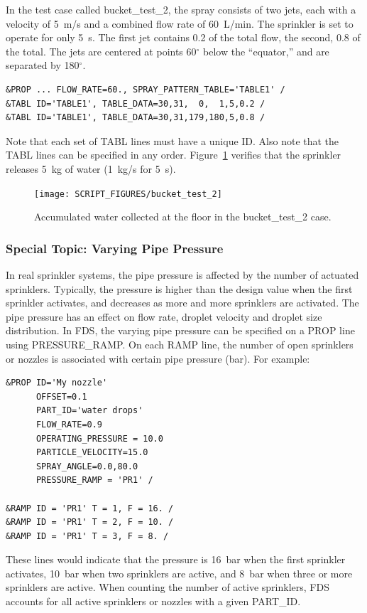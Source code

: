 \documentclass[11pt]{book}
\begin{document}
In the test case called {\ct bucket\_test\_2}, the spray consists of two jets, each with a velocity of 5~m/s and a combined flow rate of 60~L/min. The sprinkler is set to operate for only 5~s. The first jet contains 0.2 of the total flow, the second, 0.8 of the total. The jets are centered at points 60$^\circ$ below the ``equator,'' and are separated by 180$^\circ$.
\begin{lstlisting}
&PROP ... FLOW_RATE=60., SPRAY_PATTERN_TABLE='TABLE1' /
&TABL ID='TABLE1', TABLE_DATA=30,31,  0,  1,5,0.2 /
&TABL ID='TABLE1', TABLE_DATA=30,31,179,180,5,0.8 /
\end{lstlisting}
Note that each set of {\ct TABL} lines must have a unique {\ct ID}.  Also note that the {\ct TABL} lines can be specified in any order. Figure~\ref{bucket_test_2_fig} verifies that the sprinkler releases 5~kg of water (1~kg/s for 5~s).

\begin{figure}[ht]
\centering
\texttt{[image: SCRIPT\_FIGURES/bucket\_test\_2]}
\caption[Results of the {\ct bucket\_test\_2} case]{Accumulated water collected at the floor in the {\ct bucket\_test\_2} case.}
\label{bucket_test_2_fig}
\end{figure}




\subsubsection{Special Topic: Varying Pipe Pressure}
\label{info:pressureramp}

In real sprinkler systems, the pipe pressure is affected by the number of actuated sprinklers. Typically, the pressure is higher than the design value when the first sprinkler activates, and decreases as more and more sprinklers are activated. The pipe pressure has an effect on flow rate, droplet velocity and droplet size distribution. In FDS, the varying pipe pressure can be specified on a {\ct PROP} line using {\ct PRESSURE\_RAMP}. On each {\ct RAMP} line, the number of open sprinklers or nozzles is associated with certain pipe pressure (bar). For example:
\begin{lstlisting}
&PROP ID='My nozzle'
      OFFSET=0.1
      PART_ID='water drops'
      FLOW_RATE=0.9
      OPERATING_PRESSURE = 10.0
      PARTICLE_VELOCITY=15.0
      SPRAY_ANGLE=0.0,80.0
      PRESSURE_RAMP = 'PR1' /

&RAMP ID = 'PR1' T = 1, F = 16. /
&RAMP ID = 'PR1' T = 2, F = 10. /
&RAMP ID = 'PR1' T = 3, F = 8. /
\end{lstlisting}
These lines would indicate that the pressure is 16~bar when the first sprinkler activates, 10~bar when two sprinklers are active, and 8~bar when three or more sprinklers are active. When counting the number of active sprinklers, FDS accounts for all active sprinklers or nozzles with a given {\ct PART\_ID}.
\end{document}

